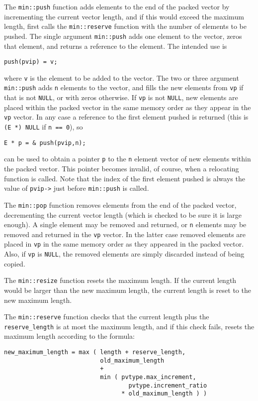 \documentclass[12pt]{article}
\newcommand{\EOL}{\penalty \exhyphenpenalty}
\newenvironment{indpar}[1][0.3in]%
	{\begin{list}{}%
		     {\setlength{\itemsep}{0in}%
		      \setlength{\topsep}{0in}%
		      \setlength{\parsep}{1ex}%
		      \setlength{\labelwidth}{#1}%
		      \setlength{\leftmargin}{#1}%
		      \addtolength{\leftmargin}{\labelsep}}%
	 \item}%
	{\end{list}}
\begin{document}
The \verb|min::push| function adds elements
to the end of the packed vector
by incrementing the current vector length, and if this would
exceed the maximum length, first calls the \verb|min::reserve| function
with the number of elements to be pushed.
The single argument {\tt min::\EOL push} adds one element to the vector,
zeros that element, and returns a reference to the element.  The
intended use is
\begin{indpar}\begin{verbatim}
push(pvip) = v;
\end{verbatim}\end{indpar}
where \verb|v| is the element to be added to the vector.
The two or three argument {\tt min::\EOL push} adds {\tt n}
elements to the vector, and fills the new elements from {\tt vp}
if that is not {\tt NULL}, or with zeros otherwise.
If \verb|vp| is not \verb|NULL|,
new elements are placed within the packed vector in the same
memory order as they appear in the \verb|vp| vector.
In any case a reference to the first element pushed is
returned (this is \verb|(E *) NULL| if \verb|n == 0|),
so
\begin{indpar}\begin{verbatim}
E * p = & push(pvip,n);
\end{verbatim}\end{indpar}
can be used to obtain a pointer \verb|p| to the \verb|n| element
vector of new elements within the packed vector.  This pointer
becomes invalid, of course, when a relocating function is called.
Note that the index of the first element pushed is always the
value of \verb|pvip->|\EOL {\tt length} just before
{\tt min::\EOL push} is called.

The \verb|min::pop| function removes elements from the end of the
packed vector, decrementing the current vector length (which is checked
to be sure it is large enough).   A single element may be removed and
returned, or \verb|n| elements may be removed and returned in the
\verb|vp| vector.  In the latter case removed elements are placed in
\verb|vp| in the same memory order as they appeared in the packed vector.
Also,
if \verb|vp| is \verb|NULL|, the removed elements are simply discarded
instead of being copied.

The \verb|min::resize| function resets the maximum length.  If
the current length would be larger than the new maximum length,
the current length is reset to the new maximum length.

The \verb|min::reserve| function checks that
the current length plus the \verb|reserve_length| is
at most the maximum length, and if this check fails,
resets the maximum length according to the formula:
\begin{indpar}\begin{verbatim}
new_maximum_length = max ( length + reserve_length,
                           old_maximum_length
                           +
                           min ( pvtype.max_increment,
                                   pvtype.increment_ratio
                                 * old_maximum_length ) )
\end{verbatim}\end{indpar}\label{PACKED-VEC-EXPANSION-FORMULA}
\end{document}
